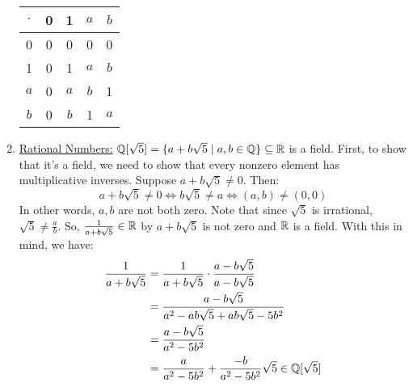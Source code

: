 \documentclass[letterpaper]{article}
\begin{document}
\begin{enumerate}
\begin{center}
        \begin{tabular}{c|c c c c}
            $\cdot$ & 0 & 1 & $a$ & $b$ \\ 
            \hline 
            0   & 0 & 0 & 0 & 0 \\ 
            1   & 0 & 1 & $a$ & $b$ \\
            $a$ & 0 & $a$ & $b$ & 1 \\ 
            $b$ & 0 & $b$ & 1 & $a$
        \end{tabular}
    \end{center}
    \item \underline{Rational Numbers:} $\mathbb{Q}[\sqrt{5}] = \{a + b\sqrt{5} \mid a, b \in \mathbb{Q}\} \subseteq \mathbb{R}$ is a field. First, to show that it's a field, we need to show that every nonzero element has multiplicative inverses. Suppose $a + b\sqrt{5} \neq 0$. Then: 
    \[a + b\sqrt{5} \neq 0 \iff b\sqrt{5} \neq a \iff (a, b) \neq (0, 0)\]
    In other words, $a, b$ are not both zero. Note that since $\sqrt{5}$ is irrational, $\sqrt{5} \neq \frac{a}{b}$. So, $\frac{1}{a + b\sqrt{5}} \in \mathbb{R}$ by $a + b\sqrt{5}$ is not zero and $\mathbb{R}$ is a field. With this in mind, we have: 
    \begin{equation*}
        \begin{aligned}
            \frac{1}{a + b\sqrt{5}} &= \frac{1}{a + b\sqrt{5}} \cdot \frac{a - b\sqrt{5}}{a - b\sqrt{5}} \\ 
                &= \frac{a - b\sqrt{5}}{a^2 - ab\sqrt{5} + ab\sqrt{5} - 5b^2} \\ 
                &= \frac{a - b\sqrt{5}}{a^2 - 5b^2} \\ 
                &= \frac{a}{a^2 - 5b^2} + \frac{-b}{a^2 - 5b^2} \sqrt{5} \in \mathbb{Q}[\sqrt{5}]
        \end{aligned}
    \end{equation*}
\end{enumerate}
\end{document}
